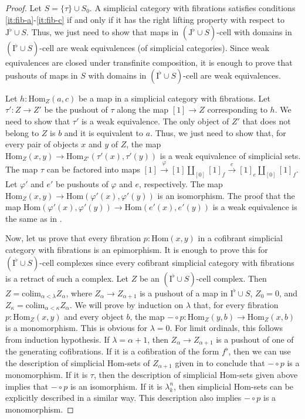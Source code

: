 \documentclass[reqno]{amsart}
\theoremstyle{definition}
\theoremstyle{remark}
\newcommand{\fs}[1]{\mathrm{#1}}
\newcommand{\Hom}{\fs{Hom}}
\newcommand{\colim}{\fs{colim}}
\newcommand{\I}{\fs{I}}
\newcommand{\J}{\fs{J}}
\newcommand{\class}[2]{#1\text{-}\mathrm{#2}}
\newcommand{\Icell}[1][\I]{\class{#1}{cell}}
\numberwithin{figure}{section}
\begin{document}
\begin{proof}
Let $S = \{ \tau \} \cup S_0$.
A simplicial category with fibrations satisfies conditions \eqref{it:fib-a}-\eqref{it:fib-c} if and only if it has the right lifting property with respect to $\J^\flat \cup S$.
Thus, we just need to show that maps in $\Icell[(\J^\flat \cup S)]$ with domains in $\Icell[(\I^\flat \cup S)]$ are weak equivalences (of simplicial categories).
Since weak equivalences are closed under transfinite composition, it is enough to prove that pushouts of maps in $S$ with domains in $\Icell[(\I^\flat \cup S)]$ are weak equivalences.

Let $h : \Hom_Z(a,c)$ be a map in a simplicial category with fibrations.
Let $\tau' : Z \to Z'$ be the pushout of $\tau$ along the map $[1] \to Z$ corresponding to $h$.
We need to show that $\tau'$ is a weak equivalence.
The only object of $Z'$ that does not belong to $Z$ is $b$ and it is equivalent to $a$.
Thus, we just need to show that, for every pair of objects $x$ and $y$ of $Z$, the map $\Hom_Z(x,y) \to \Hom_{Z'}(\tau'(x),\tau'(y))$ is a weak equivalence of simplicial sets.
The map $\tau$ can be factored into maps $[1] \xrightarrow{\varphi} [1] \amalg_{[0]} [1]_f \xrightarrow{e} [1]_e \amalg_{[0]} [1]_f$.
Let $\varphi'$ and $e'$ be pushouts of $\varphi$ and $e$, respectively.
The map $\Hom_Z(x,y) \to \Hom(\varphi'(x),\varphi'(y))$ is an isomorphism.
The proof that the map $\Hom(\varphi'(x),\varphi'(y)) \to \Hom(e'(x),e'(y))$ is a weak equivalence is the same as in \cite[Proposition~A.3.2.4]{lurie-topos}.

Now, let us prove that every fibration $p : \Hom(x,y)$ in a cofibrant simplicial category with fibrations is an epimorphism.
It is enough to prove this for $\Icell[(\I^\flat \cup S)]$ complexes since every cofibrant simplicial category with fibrations is a retract of such a complex.
Let $Z$ be an $\Icell[(\I^\flat \cup S)]$ complex.
Then $Z = \colim_{\alpha < \lambda} Z_\alpha$, where $Z_\alpha \to Z_{\alpha + 1}$ is a pushout of a map in $\I^\flat \cup S$, $Z_0 = 0$, and $Z_\kappa = \colim_{\alpha < \kappa} Z_\alpha$.
We will prove by induction on $\lambda$ that, for every fibration $p : \Hom_Z(x,y)$ and every object $b$, the map $- \circ p : \Hom_Z(y,b) \to \Hom_Z(x,b)$ is a monomorphism.
This is obvious for $\lambda = 0$.
For limit ordinals, this follows from induction hypothesis.
If $\lambda = \alpha+1$, then $Z_\alpha \to Z_{\alpha+1}$ is a pushout of one of the generating cofibrations.
If it is a cofibration of the form $f^\flat$, then we can use the description of simplicial $\Hom$-sets of $Z_{\alpha+1}$ given in \cite[Proposition~A.3.2.4]{lurie-topos} to conclude that $- \circ p$ is a monomorphism.
If it is $\tau$, then the description of simplicial $\Hom$-sets given above implies that $- \circ p$ is an isomorphism.
If it is $\lambda^n_k$, then simplicial $\Hom$-sets can be explicitly described in a similar way.
This description also implies $- \circ p$ is a monomorphism.


\end{proof}
\end{document}
